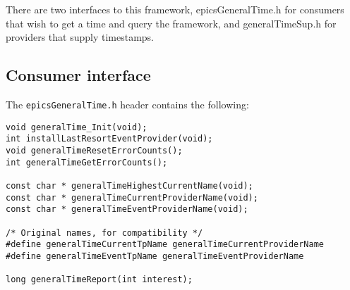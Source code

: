 There are two interfaces to this framework, epicsGeneralTime.h for consumers that wish to get a time and query the 
framework, and generalTimeSup.h for providers that supply timestamps.

\subsection{Consumer interface}

The \verb|epicsGeneralTime.h| header contains the following:

\begin{verbatim}
void generalTime_Init(void);
int installLastResortEventProvider(void);
void generalTimeResetErrorCounts();
int generalTimeGetErrorCounts();

const char * generalTimeHighestCurrentName(void);
const char * generalTimeCurrentProviderName(void);
const char * generalTimeEventProviderName(void);

/* Original names, for compatibility */
#define generalTimeCurrentTpName generalTimeCurrentProviderName
#define generalTimeEventTpName generalTimeEventProviderName

long generalTimeReport(int interest);
\end{verbatim}

